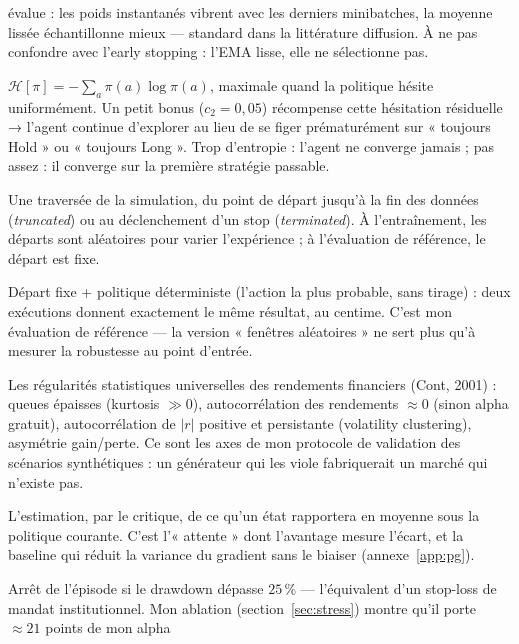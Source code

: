 \documentclass[11pt,a4paper]{article}
\begin{document}
\begin{description}[itemsep=4pt, font=\normalfont\bfseries]
        évalue : les poids instantanés vibrent avec les derniers minibatches, la
        moyenne lissée échantillonne mieux --- standard dans la littérature diffusion.
        À ne pas confondre avec l'early stopping : l'EMA lisse, elle ne sélectionne pas.
  \item[Entropie (bonus d')] $\mathcal{H}[\pi] = -\sum_a \pi(a)\log\pi(a)$, maximale
        quand la politique hésite uniformément. Un petit bonus ($c_2 = 0{,}05$)
        récompense cette hésitation résiduelle → l'agent continue d'explorer au lieu
        de se figer prématurément sur « toujours Hold » ou « toujours Long ». Trop
        d'entropie : l'agent ne converge jamais ; pas assez : il converge sur la
        première stratégie passable.
  \item[Épisode] Une traversée de la simulation, du point de départ jusqu'à la fin
        des données (\emph{truncated}) ou au déclenchement d'un stop
        (\emph{terminated}). À l'entraînement, les départs sont aléatoires pour
        varier l'expérience ; à l'évaluation de référence, le départ est fixe.
  \item[Épisode déterministe (full-split)] Départ fixe + politique déterministe
        (l'action la plus probable, sans tirage) : deux exécutions donnent exactement
        le même résultat, au centime. C'est mon évaluation de référence --- la
        version « fenêtres aléatoires » ne sert plus qu'à mesurer la robustesse au
        point d'entrée.
  \item[Faits stylisés] Les régularités statistiques universelles des rendements
        financiers (Cont, 2001) : queues épaisses (kurtosis $\gg 0$), autocorrélation
        des rendements $\approx 0$ (sinon alpha gratuit), autocorrélation de $|r|$
        positive et persistante (volatility clustering), asymétrie gain/perte. Ce sont
        les axes de mon protocole de validation des scénarios synthétiques : un
        générateur qui les viole fabriquerait un marché qui n'existe pas.
  \item[Fonction de valeur $V(s)$] L'estimation, par le critique, de ce qu'un état
        rapportera en moyenne sous la politique courante. C'est l'« attente » dont
        l'avantage mesure l'écart, et la baseline qui réduit la variance du gradient
        sans le biaiser (annexe~\ref{app:pg}).
  \item[Kill-switch] Arrêt de l'épisode si le drawdown dépasse $25\,\%$ ---
        l'équivalent d'un stop-loss de mandat institutionnel. Mon ablation
        (section~\ref{sec:stress}) montre qu'il porte $\approx 21$ points de mon alpha

\end{description}
\end{document}
